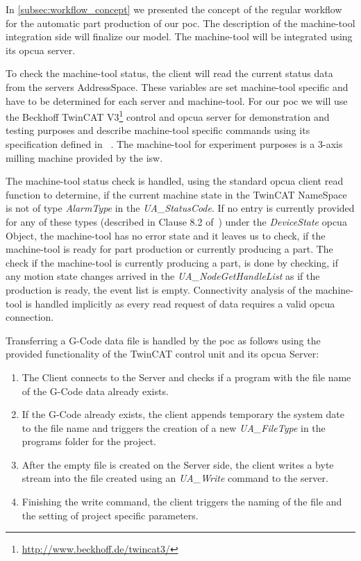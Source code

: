 \documentclass[
a4paper,
twoside,
headsepline,
cleardoublepage=empty,
parskip=half,
draft=false
]{scrbook}
\begin{document}
				In \cref{subsec:workflow_concept} we presented the concept of the regular workflow for the automatic part production of our \gls{poc}. The description of the machine-tool integration side will finalize our model. The machine-tool will be integrated using its \gls{opcua} server.

				To check the machine-tool status, the client will read the current status data from the servers AddressSpace. These variables are set machine-tool specific and have to be determined for each server and machine-tool. For our \gls{poc} we will use the Beckhoff TwinCAT V3\footnote{\url{http://www.beckhoff.de/twincat3/}} control and \gls{opcua} server for demonstration and testing purposes and describe machine-tool specific commands using its specification defined in ~\cite{twincat2018}. The machine-tool for experiment purposes is a 3-axis milling machine provided by the \gls{isw}.

				The machine-tool status check is handled, using the standard \gls{opcua} client read function to determine, if the current machine state in the TwinCAT NameSpace is not of type \textit{AlarmType} in the \textit{UA\_StatusCode}. If no entry is currently provided for any of these types (described in Clause 8.2 of~\cite{twincat2018}) under the \textit{DeviceState} \gls{opcua} Object, the machine-tool has no error state and it leaves us to check, if the machine-tool is ready for part production or currently producing a part. The check if the machine-tool is currently producing a part, is done by checking, if any motion state changes arrived in the \textit{UA\_NodeGetHandleList} as if the production is ready, the event list is empty. Connectivity analysis of the machine-tool is handled implicitly as every read request of data requires a valid \gls{opcua} connection.

	\newpage

				Transferring a G-Code data file is handled by the \gls{poc} as follows using the provided functionality of the TwinCAT control unit and its \gls{opcua} Server:

				\begin{enumerate}
					\item The Client connects to the Server and checks if a program with the file name of the G-Code data already exists.
					\item If the G-Code already exists, the client appends temporary the system date to the file name and triggers the creation of a new \textit{UA\_FileType} in the programs folder for the project.
					\item After the empty file is created on the Server side, the client writes a byte stream into the file created using an \textit{UA\_Write} command to the server.
					\item Finishing the write command, the client triggers the naming of the file and the setting of project specific parameters.
				\end{enumerate}
\end{document}
